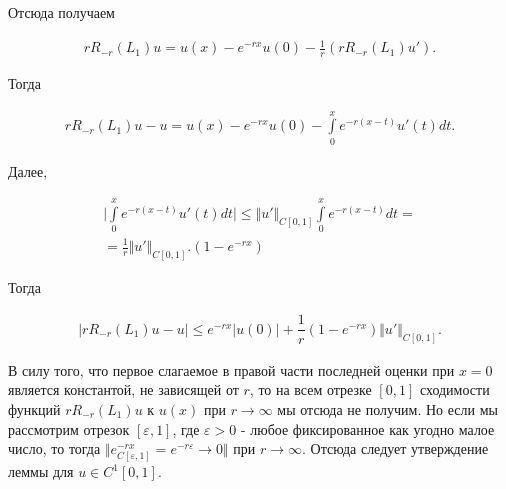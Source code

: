 Отсюда получаем

\begin{equation}
\begin{array}{c}
\nonumber

rR_{-r}(L_1)u = u(x) - e^{-rx}u(0) - \frac{1}{r} (rR_{-r}(L_1)u').

\end{array}
\end{equation}

Тогда

\begin{equation}
\begin{array}{c}
\nonumber

rR_{-r}(L_1)u - u = u(x) - e^{-rx}u(0) - \int\limits_0^x e^{-r(x-t)}u'(t)dt.

\end{array}
\end{equation}

Далее,

\begin{equation}
\begin{array}{c}
\nonumber

\biggl| \int\limits_0^x e^{-r(x-t)}u'(t)dt \biggr| \leq \Vert u' \Vert_{C[0,1]} \int\limits_0^x e^{-r(x-t)}dt = \\
= \frac{1}{r} \Vert u' \Vert_{C[0,1]}.
(1 - e^{-rx}) 
\end{array}
\end{equation}

Тогда

\begin{equation}
\begin{array}{c}

\bigl| rR_{-r}(L_1)u - u \bigr| \leq e^{-rx} \bigl| u(0) \bigr| + \dfrac{1}{r} (1-e^{-rx})\Vert u' \Vert_{C[0,1]}.

\end{array}
\end{equation}

В силу того, что первое слагаемое в правой части последней оценки при $ x = 0 $ является константой, не зависящей от $ r $, то на всем отрезке $ [0,1] $ сходимости функций $ rR_{-r}(L_1)u $ к $ u(x) $ при $ r \rightarrow \infty $ мы отсюда не получим. Но если мы рассмотрим отрезок $ [\varepsilon, 1] $, где $ \varepsilon > 0 $ - любое фиксированное как угодно малое число, то тогда $ \Vert e^{-rx}_{C[\varepsilon,1]} = e^{-r\varepsilon} \rightarrow 0 \Vert $ при $ r \rightarrow \infty $. Отсюда следует утверждение леммы для $ u \in C^1[0,1] $.

